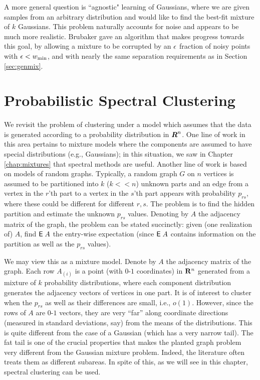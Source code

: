 \documentclass{book}
\numberwithin{exercise}{chapter}
\begin{document}
A more general question is ``agnostic" learning of Gaussians, where we are given samples from an arbitrary distribution and would like to find the best-fit mixture of $k$ Gaussians. This problem naturally accounts for noise and appears to be much more realistic. Brubaker \cite{Brubaker2009a} gave an algorithm that makes progress towards this goal, by allowing a mixture to be corrupted by an $\epsilon$ fraction of noisy points with $\epsilon < w_{\min}$, and with nearly the same separation requirements as in Section \ref{sec:genmix}.










\chapter{Probabilistic Spectral Clustering}\label{chap:prob}

We revisit the problem of clustering under a model which assumes that the data
is
generated according to a probability distribution in $\mbox{\mbox{\boldmath $R$}}^n$. One line of work
in this area pertains to mixture models where the components are assumed to have
special
distributions (e.g., Gaussians); in this situation, we saw in Chapter \ref{chap:mixtures} that
spectral methods are useful. Another line of work is based on models of
random graphs.
Typically, a random graph $G$ on $n$
vertices is assumed to be partitioned into $k$ ($k<<n$) unknown parts and
an edge from a vertex in the $r$'th part to
a vertex in the $s$'th part appears with probability $p_{rs}$, where these
could be different for different $r,s$. The problem is to find the hidden
partition
and estimate the unknown $p_{rs}$ values. Denoting by $A$ the
adjacency matrix of the graph, the problem can be stated succinctly: given (one realization of) $A$, find $\hbox{{\sf E}\;} A$ the entry-wise expectation (since $\hbox{{\sf E}\;} A$ contains information on the partition as well as the $p_{rs}$ values).

We may view this as a mixture model. Denote by $A$ the adjacency matrix
of the graph. Each row $A_{(i)}$ is a point (with $0$-$1$ coordinates) in ${\bf
R}^n$
generated from a mixture of $k$ probability distributions, where each component
distribution generates the adjacency vectors of vertices in one part.
It is of interest to cluster when the $p_{rs}$ as well as their differences
are small, i.e., $o(1)$. However, since the rows of $A$ are $0$-$1$
vectors, they are very ``far'' along coordinate directions
(measured in standard deviations, say)
from the means of the distributions.
This is quite different from the case of a
Gaussian (which has a very narrow tail). The fat tail is one of the crucial
properties that makes the planted graph problem
very different from the Gaussian mixture problem. Indeed, the literature often treats
them
as different subareas. In spite of this, as we will see in this chapter,
spectral clustering can be used.
\end{document}
